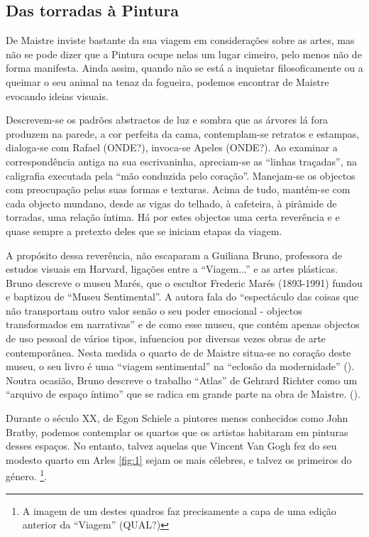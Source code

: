 \documentclass[12pt]{article}
\begin{document}
\subsection{Das torradas à Pintura}

De Maistre inviste bastante da sua viagem em considerações sobre as artes, mas não se pode dizer que a Pintura ocupe nelas um lugar cimeiro, pelo menos não de forma manifesta. Ainda assim, quando não se está a inquietar filosoficamente ou a queimar o seu animal na tenaz da fogueira, podemos encontrar de Maistre evocando ideias visuais.

Descrevem-se os padrões abstractos de luz e sombra que as árvores lá fora produzem na parede, a cor perfeita da cama, contemplam-se retratos e estampas, dialoga-se com Rafael (ONDE?), invoca-se Apeles (ONDE?). Ao examinar a correspondência antiga na sua escrivaninha, apreciam-se as ``linhas traçadas'', na caligrafia executada pela ``mão conduzida pelo coração''. Manejam-se os objectos com preocupação pelas suas formas e texturas. Acima de tudo, mantém-se com cada objecto mundano, desde as vigas do telhado, à cafeteira, à pirâmide de torradas, uma relação íntima. Há por estes objectos uma certa reverência e e quase sempre a pretexto deles que se iniciam etapas da viagem.

A propósito dessa reverência, não escaparam a Guiliana Bruno, professora de estudos visuais em Harvard, ligações entre a ``Viagem...'' e as artes plásticas. Bruno descreve o museu Marés, que o escultor Frederic Marés (1893-1991) fundou e baptizou de ``Museu Sentimental''. A autora fala do ``espectáculo das coisas que não transportam outro valor senão o seu poder emocional - objectos transformados em narrativas'' e de como esse museu, que contém apenas objectos de uso pessoal de vários tipos, infuenciou por diversas vezes obras de arte contemporânea. Nesta medida o quarto de de Maistre situa-se no coração deste museu, o seu livro é uma ``viagem sentimental'' na ``eclosão da modernidade'' (\cite[p.133]{bruno2002atlas}). Noutra ocasião, Bruno descreve o trabalho ``Atlas'' de Gehrard Richter como um ``arquivo de espaço íntimo'' que se radica em grande parte na obra de Maistre. (\cite[p.254]{bruno2002atlas}).

Durante o século XX, de Egon Schiele a pintores menos conhecidos como John Bratby, podemos contemplar os quartos que os artistas habitaram em pinturas desses espaços. No entanto, talvez aquelas que Vincent Van Gogh fez do seu modesto quarto em Arles \ref{fig:1} sejam os mais célebres, e talvez os primeiros do género. \footnote{A imagem de um destes quadros faz precisamente a capa de uma edição anterior da ``Viagem'' (QUAL?)}.
\end{document}
